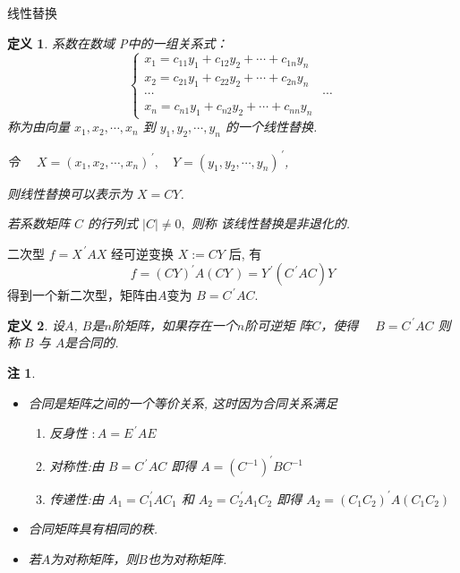 \documentclass[13pt]{beamer}
\newtheorem*{defi}{定义}
\newtheorem*{rem}{注}
\begin{document}
\begin{frame}{线性替换} 
\begin{defi}
系数在数域 P中的一组关系式：
\[
\left\{\begin{array}{cc}
x_{1}=c_{11} y_{1}+c_{12} y_{2}+\cdots+c_{1 n} y_{n} \\
x_{2}=c_{21} y_{1}+c_{22} y_{2}+\cdots+c_{2 n} y_{n} \\
\cdots & \cdots \\
x_{n}=c_{n 1} y_{1}+c_{n 2} y_{2}+\cdots+c_{n n} y_{n}
\end{array}\right.
\]
称为由向量 $x_{1}, x_{2}, \cdots, x_{n}$ 到 $y_{1}, y_{2}, \cdots, y_{n}$ 的一个\alert{线性替换}.

令
$
\quad X=\left(x_{1}, x_{2}, \cdots, x_{n}\right)^{\, \prime}, 
\quad Y=\left(y_{1}, y_{2}, \cdots, y_{n}\right)^{\,\prime}
$,

则线性替换可以表示为 $X=C Y$.  

若系数矩阵 $C$ 的行列式 $|C| \neq 0,$ 则称
该线性替换是\alert{非退化}的.
\end{defi}
\end{frame}

\begin{frame}
二次型 $f=X^{\, \prime} A X$ 经可逆变换 $X := C Y$ 后, 有
\[
f=(C Y)^{\prime} A(C Y\, )=Y^{\, \prime}\left(C^{\, \prime} A C \right) Y
\]
得到一个新二次型，矩阵由$A$变为 $B=C^{\, \prime} A C$.

\begin{defi}
设$A$, $B$是$n$阶矩阵，如果存在一个$n$阶可逆矩
阵$C$，使得 $\quad {B}={C}^{\, \prime} {A} {C}$
则称 $B$ 与 $A$是合同的. 
\end{defi}

\begin{rem}
\begin{itemize}
\item 	合同是矩阵之间的一个等价关系, 这时因为合同关系满足
\begin{enumerate}
\item  反身性 $: A=E^{\, \prime} A E$
\item  对称性:由 ${B}={C}^{\, \prime} {A C}$ 即得 ${A}=\left({C}^{-1}\right)^{\prime} {B} {C}^{-1}$
\item  传递性:由 ${A}_{1}={C}_{1}^{\, \prime} {A C}_{1}$ 和 ${A}_{2}={C}_{2}^{\, \prime} {A}_{1} {C}_{2}$ 即得
${A}_{2}=\left({C}_{1} {C}_{2}\right)^{\prime} {A}\left({C}_{1} {C}_{2}\right)$
\end{enumerate}
\item 合同矩阵具有相同的秩. 
\item 若$A$为对称矩阵，则$B$也为对称矩阵. 
\end{itemize}
\end{rem}
\end{frame}
\end{document}
